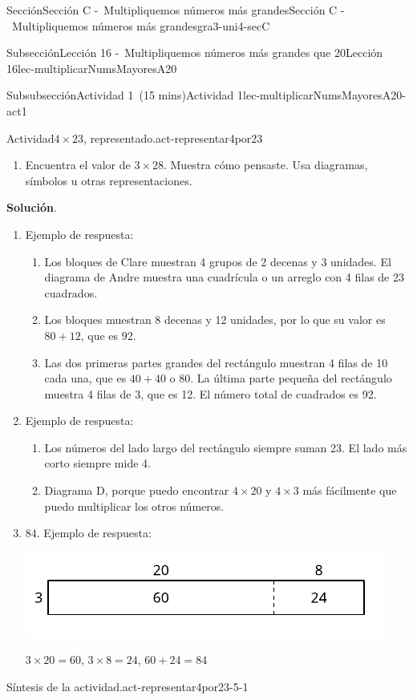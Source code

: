 \documentclass[oneside,10pt,]{article}
\newcommand{\blocktitlefont}{\relax}
\begin{document}
\begin{sectionptx}{Sección}{Sección C -~Multipliquemos números más grandes}{}{Sección C -~Multipliquemos números más grandes}{}{}{gra3-uni4-secC}
\begin{subsectionptx}{Subsección}{Lección 16 -~Multipliquemos números más grandes que 20}{}{Lección 16}{}{}{lec-multiplicarNumsMayoresA20}
\begin{subsubsectionptx}{Subsubsección}{Actividad 1~(15 mins)}{}{Actividad 1}{}{}{lec-multiplicarNumsMayoresA20-act1}
\begin{activity}{Actividad}{\(4\times 23\), representado.}{act-representar4por23}
\begin{enumerate}
\begin{enumerate}
\end{enumerate}
\item{}Encuentra el valor de \(3\times 28\). Muestra cómo pensaste. Usa diagramas, símbolos u otras representaciones.%
\end{enumerate}
\par\smallskip%
\noindent\textbf{\blocktitlefont Solución}.\hypertarget{act-representar4por23-3}{}\quad{}%
\begin{enumerate}
\item{}Ejemplo de respuesta:%
%
\begin{enumerate}
\item{}Los bloques de Clare muestran 4 grupos de 2 decenas y 3 unidades. El diagrama de Andre muestra una cuadrícula o un arreglo con 4 filas de 23 cuadrados.%
\item{}Los bloques muestran 8 decenas y 12 unidades, por lo que su valor es \(80 + 12\), que es 92.%
\item{}Las dos primeras partes grandes del rectángulo muestran 4 filas de 10 cada una, que es \(40 + 40\) o 80. La última parte pequeña del rectángulo muestra 4 filas de 3, que es 12. El número total de cuadrados es 92.%
\end{enumerate}
\item{}Ejemplo de respuesta:%
%
\begin{enumerate}
\item{}Los números del lado largo del rectángulo siempre suman 23. El lado más corto siempre mide 4.%
\item{}Diagrama D, porque puedo encontrar \(4 \times 20\) y \(4 \times 3\) más fácilmente que puedo multiplicar los otros números.%
\end{enumerate}
\item{}84. Ejemplo de respuesta:%
\begin{image}{0}{1}{0}{}%
\includegraphics[width=\linewidth]{external/svg-source/tikz-file-152975.pdf}
\end{image}%
\(3 \times 20 = 60\), \(3 \times 8 = 24\), \(60 + 24 = 84\)%
\end{enumerate}
\end{activity}%
\par
\begin{paragraphs}{Síntesis de la actividad.}{act-representar4por23-5-1}%

\end{paragraphs}
\end{subsubsectionptx}
\end{subsectionptx}
\end{sectionptx}
\end{document}
